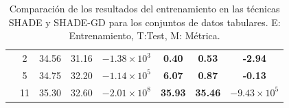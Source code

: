 \begin{table}[]
{\begin{tabular}{|c|c|ccc|ccc|}
                                  & 2                               & \multicolumn{1}{c|}{34.56}         & \multicolumn{1}{c|}{31.16}         & $-1.38 \times 10^{3}$ & \multicolumn{1}{c|}{\textbf{0.40}}   & \multicolumn{1}{c|}{\textbf{0.53}}   & \textbf{-2.94}                 \\ \cline{2-8} 
                                  & 5                               & \multicolumn{1}{c|}{34.75}         & \multicolumn{1}{c|}{32.20}         & $-1.14 \times 10^{5}$ & \multicolumn{1}{c|}{\textbf{6.07}}   & \multicolumn{1}{c|}{\textbf{0.87}}   & \textbf{-0.13}                 \\ \cline{2-8} 
                                  & 11                              & \multicolumn{1}{c|}{35.30}         & \multicolumn{1}{c|}{32.60}         & $-2.01 \times 10^{8}$ & \multicolumn{1}{c|}{\textbf{35.93}}  & \multicolumn{1}{c|}{\textbf{35.46}}  & \textbf{$-9.43 \times 10^{5}$} \\ \hline
\end{tabular}}
\caption{Comparación de los resultados del entrenamiento en las técnicas SHADE y SHADE-GD para los conjuntos de datos tabulares. E: Entrenamiento, T:Test, M: Métrica.}
\label{tab:shadevsshadegd}
\end{table}


